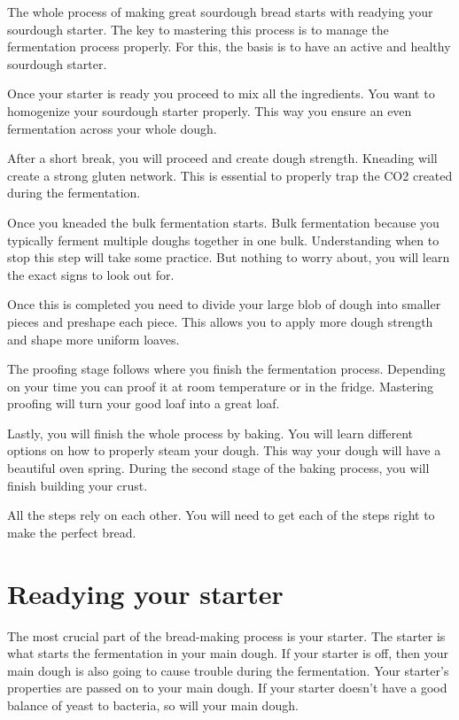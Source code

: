 The whole process of making great sourdough bread starts with
readying your sourdough starter. The key to mastering
this process is to manage the fermentation process properly.
For this, the basis is to have an active and healthy
sourdough starter.

Once your starter is ready you proceed to mix all the ingredients.
You want to homogenize your sourdough starter properly. This
way you ensure an even fermentation across your whole dough.

After a short break, you will proceed and create dough strength.
Kneading will create a strong gluten network. This is essential
to properly trap the CO2 created during the fermentation.

Once you kneaded the bulk fermentation starts. Bulk fermentation
because you typically ferment multiple doughs together in one bulk.
Understanding when to stop this step will take some practice.
But nothing to worry about, you will learn the exact signs to look out for.

Once this is completed you need to divide your large blob of
dough into smaller pieces and preshape each piece. This allows
you to apply more dough strength and shape more uniform loaves.

The proofing stage follows where you finish the fermentation process.
Depending on your time you can proof it at room temperature or in the fridge.
Mastering proofing will turn your good loaf into a great loaf.

Lastly, you will finish the whole process by baking. You will learn different
options on how to properly steam your dough. This way your
dough will have a beautiful oven spring. During the second
stage of the baking process, you will finish building your crust.

All the steps rely on each other. You will need to get each of
the steps right to make the perfect bread.

\section{Readying your starter}
\label{section:readying-starter}

The most crucial part of the bread-making process is your starter.
The starter is what starts the fermentation in your main dough.
If your starter is off, then your main dough is also going
to cause trouble during the fermentation. Your starter's
properties are passed on to your main dough. If your starter
doesn't have a good balance of yeast to bacteria, so will your
main dough.

